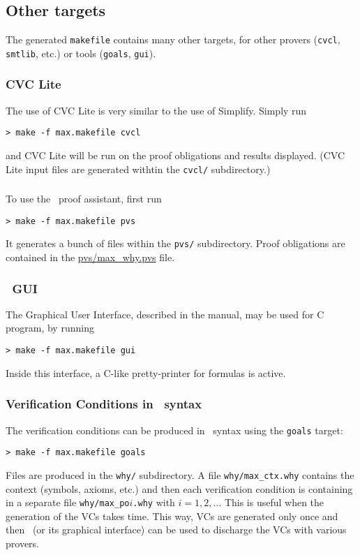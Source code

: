 \documentclass[12pt,a4paper,twoside,openright]{report}
\makeatletter
\newcommand{\simplify}{\textsf{Simplify}\index{Simplify@\textsf{Simplify}}}
\makeatother
\begin{document}
\subsection*{Other targets}

The generated \texttt{makefile} contains many other targets, for other
provers (\texttt{cvcl}, \texttt{smtlib}, etc.) or tools
(\texttt{goals}, \texttt{gui}).

\subsubsection*{\textsf{CVC Lite}}
The use of \textsf{CVC Lite} is very similar to the use of
\simplify. Simply run
\begin{verbatim}
> make -f max.makefile cvcl
\end{verbatim}
and \textsf{CVC Lite} will be run on the proof obligations and results
displayed. (\textsf{CVC Lite} input files are generated withtin the
\texttt{cvcl/} subdirectory.)

\subsubsection*{\pvs} 
To use the \pvs\ proof assistant, first run
\begin{verbatim}
> make -f max.makefile pvs
\end{verbatim}
It generates a bunch of files within the \texttt{pvs/}
subdirectory. Proof obligations are contained in the
\url{pvs/max_why.pvs} file. 

\subsubsection*{\why\ GUI}

The \why{} Graphical User Interface, described in the \why{} manual,
may be used for C program, by running
\begin{verbatim}
> make -f max.makefile gui
\end{verbatim}
Inside this interface, a C-like pretty-printer for formulas is active.

\subsubsection{Verification Conditions in \why\ syntax}

The verification conditions can be produced in \why\ syntax using the
\texttt{goals} target:
\begin{verbatim}
> make -f max.makefile goals
\end{verbatim}
Files are produced in the \texttt{why/} subdirectory. A file
\texttt{why/max\_ctx.why} contains the context (symbols, axioms, etc.)
and then each verification condition is containing in a separate file
\texttt{why/max\_po$i$.why} with $i=1,2,\dots$ 
This is useful when the generation  of the VCs takes time.
This way, VCs are generated only once and then \why\ (or its
graphical interface) can be used to discharge the VCs with various provers.
\end{document}
